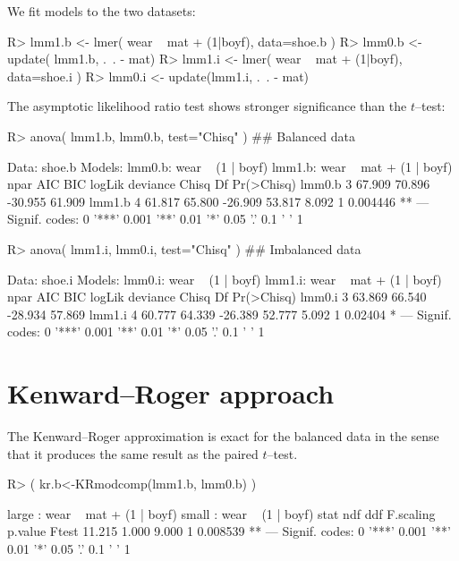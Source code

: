 \documentclass[11pt]{article}
\begin{document}
We fit models to the two datasets:

\begin{Schunk}
\begin{Sinput}
R> lmm1.b  <- lmer( wear ~ mat + (1|boyf), data=shoe.b )
R> lmm0.b  <- update( lmm1.b, .~. - mat)
R> lmm1.i  <- lmer( wear ~ mat + (1|boyf), data=shoe.i )
R> lmm0.i  <- update(lmm1.i, .~. - mat)
\end{Sinput}
\end{Schunk}

The asymptotic likelihood ratio test shows stronger significance than
the $t$--test:

\begin{Schunk}
\begin{Sinput}
R> anova( lmm1.b, lmm0.b, test="Chisq" ) ## Balanced data
\end{Sinput}
\begin{Soutput}
Data: shoe.b
Models:
lmm0.b: wear ~ (1 | boyf)
lmm1.b: wear ~ mat + (1 | boyf)
       npar    AIC    BIC  logLik deviance Chisq Df Pr(>Chisq)   
lmm0.b    3 67.909 70.896 -30.955   61.909                       
lmm1.b    4 61.817 65.800 -26.909   53.817 8.092  1   0.004446 **
---
Signif. codes:  0 '***' 0.001 '**' 0.01 '*' 0.05 '.' 0.1 ' ' 1
\end{Soutput}
\begin{Sinput}
R> anova( lmm1.i, lmm0.i, test="Chisq" ) ## Imbalanced data
\end{Sinput}
\begin{Soutput}
Data: shoe.i
Models:
lmm0.i: wear ~ (1 | boyf)
lmm1.i: wear ~ mat + (1 | boyf)
       npar    AIC    BIC  logLik deviance Chisq Df Pr(>Chisq)  
lmm0.i    3 63.869 66.540 -28.934   57.869                      
lmm1.i    4 60.777 64.339 -26.389   52.777 5.092  1    0.02404 *
---
Signif. codes:  0 '***' 0.001 '**' 0.01 '*' 0.05 '.' 0.1 ' ' 1
\end{Soutput}
\end{Schunk}

\section{Kenward--Roger approach}
\label{sec:kenw-roger-appr}


The Kenward--Roger approximation is exact for the balanced data in the
sense that it produces the same result as the paired $t$--test.

\begin{Schunk}
\begin{Sinput}
R> ( kr.b<-KRmodcomp(lmm1.b, lmm0.b) )
\end{Sinput}
\begin{Soutput}
large : wear ~ mat + (1 | boyf)
small : wear ~ (1 | boyf)
        stat    ndf    ddf F.scaling  p.value   
Ftest 11.215  1.000  9.000         1 0.008539 **
---
Signif. codes:  0 '***' 0.001 '**' 0.01 '*' 0.05 '.' 0.1 ' ' 1
\end{Soutput}
\end{Schunk}
\end{document}
